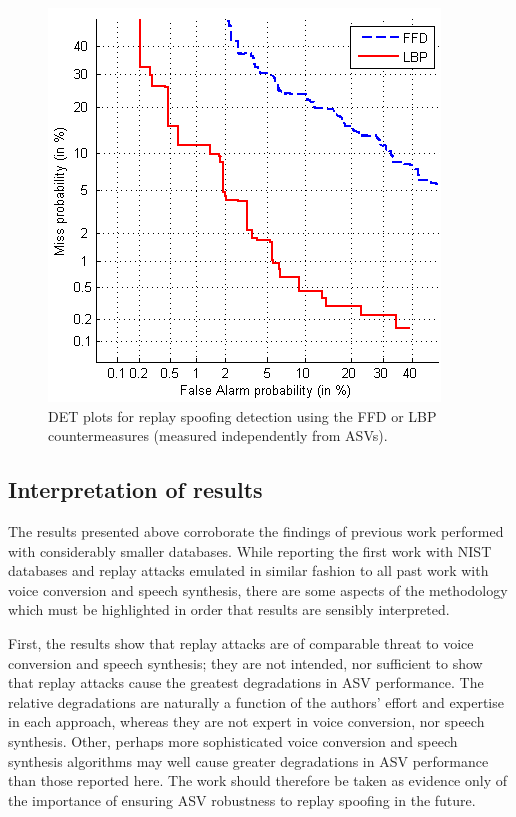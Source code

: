 \begin{figure}
	\centering
\includegraphics[width=1\linewidth]{Figs/DET_CM.png}
	\caption{DET plots for replay spoofing detection using the FFD or LBP countermeasures (measured independently from ASVs).} %
	\label{fig::DETs_CM}
\end{figure}



\subsection{Interpretation of results}

The results presented above corroborate the findings of previous work performed with considerably smaller databases.  While reporting the first work with NIST databases and replay attacks emulated in similar fashion to all past work with voice conversion and speech synthesis, there are some aspects of the methodology which must be highlighted in order that results are sensibly interpreted.

First, the results show that replay attacks are of comparable threat to voice conversion and speech synthesis; they are not intended, nor sufficient to show that replay attacks cause the greatest degradations in ASV performance.  The relative degradations are naturally a function of the authors' effort and expertise in each approach, whereas they are not expert in voice conversion, nor speech synthesis.  Other, perhaps more sophisticated voice conversion and speech synthesis algorithms may well cause greater degradations in ASV performance than those reported here.  The work should therefore be taken as evidence only of the importance of ensuring ASV robustness to replay spoofing in the future.

